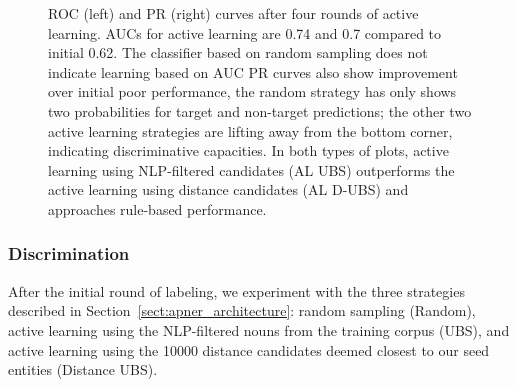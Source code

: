\begin{figure}
\begin{minipage}[b]{.4\textwidth}
\captionsetup{labelformat=empty}
\label{fig:prcs_round5}
\end{minipage}
\caption{ROC (left) and PR (right) curves after four rounds of active learning. 
AUCs for active learning are 0.74 and 0.7  compared to initial 0.62. 
The classifier based on random sampling does not indicate learning based on AUC 
PR curves also show improvement over initial poor performance,
the random strategy has only shows two probabilities for target and non-target predictions; 
the other two active learning strategies are lifting away from the bottom corner, indicating discriminative capacities.
In both types of plots, active learning using NLP-filtered candidates (AL UBS) outperforms the active learning using distance candidates (AL D-UBS) and approaches rule-based performance.
}\label{fig:rocs_prcs_round5}
\end{figure}

\subsubsection{Discrimination}
After the initial round of labeling, we experiment with the three strategies described in Section~\ref{sect:apner_architecture}: random sampling (Random), 
active learning using the NLP-filtered nouns from the training corpus (UBS), 
and active learning using the \num{10000} distance candidates deemed closest to our seed entities (Distance UBS). %

